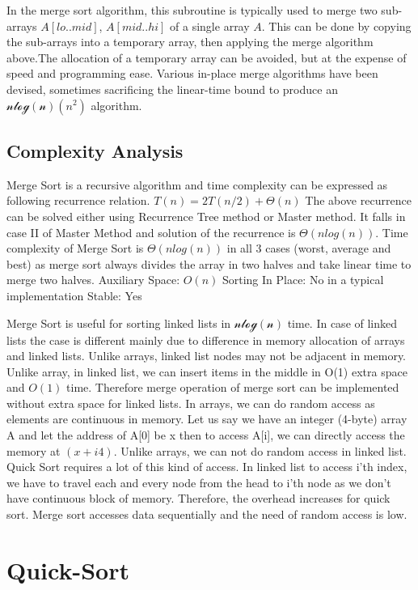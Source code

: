 In the merge sort algorithm, this subroutine is typically used to merge two sub-arrays $A[lo..mid]$, $A[mid..hi]$ of a single array $A$. This can be done by copying the sub-arrays into a temporary array, then applying the merge algorithm above.The allocation of a temporary array can be avoided, but at the expense of speed and programming ease. Various in-place merge algorithms have been devised, sometimes sacrificing the linear-time bound to produce an $\mathcal{nlog(n)}(n^2)$ algorithm.

\subsection{Complexity Analysis}

Merge Sort is a recursive algorithm and time complexity can be expressed as following recurrence relation.
$T(n) = 2T(n/2) + \Theta(n)$
The above recurrence can be solved either using Recurrence Tree method or Master method. It falls in case II of Master Method and solution of the recurrence is $\Theta(nlog(n))$.
Time complexity of Merge Sort is $\Theta(nlog(n))$ in all 3 cases (worst, average and best) as merge sort always divides the array in two halves and take linear time to merge two halves.
Auxiliary Space: $O(n)$
Sorting In Place: No in a typical implementation
Stable: Yes


Merge Sort is useful for sorting linked lists in $\mathcal{nlog(n)}$ time. In case of linked lists the case is different mainly due to difference in memory allocation of arrays and linked lists. Unlike arrays, linked list nodes may not be adjacent in memory. Unlike array, in linked list, we can insert items in the middle in O(1) extra space and $O(1)$ time. Therefore merge operation of merge sort can be implemented without extra space for linked lists.
In arrays, we can do random access as elements are continuous in memory. Let us say we have an integer (4-byte) array A and let the address of A[0] be x then to access A[i], we can directly access the memory at $(x + i4)$. Unlike arrays, we can not do random access in linked list. Quick Sort requires a lot of this kind of access. In linked list to access i’th index, we have to travel each and every node from the head to i’th node as we don’t have continuous block of memory. Therefore, the overhead increases for quick sort. Merge sort accesses data sequentially and the need of random access is low.

\section{Quick-Sort}

